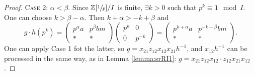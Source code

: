 \begin{proof}
\textsc{Case 2:} $\alpha<\beta$. Since $\mathbb{Z}[\sfrac{1}{p}]/I$ is finite, $\exists k>0$ such that $p^k\equiv 1\mod I$. One can choose $k>\beta-\alpha$. Then $k+\alpha>-k+\beta$ and
\[ g\cdot h(p^k) =
\begin{pmatrix} p^\alpha a & p^\beta bm \\ * & * \end{pmatrix}
\begin{pmatrix} p^k & 0 \\ 0 & p^{-k} \end{pmatrix}=
\begin{pmatrix} p^{k+\alpha} a & p^{-k+\beta} bm \\ * & * \end{pmatrix}.
\]
One can apply Case 1 fot the latter, so
$g=x_{21}z_{12}x_{12}x_{21}h^{-1}$,
and $x_{12}h^{-1}$ can be processed in the same way, as in Lemma \ref{lemma:srRI1}:
$g=x_{21}z_{12}x_{12}\cdot z_{12}x_{21}x_{12}$.
\end{proof}